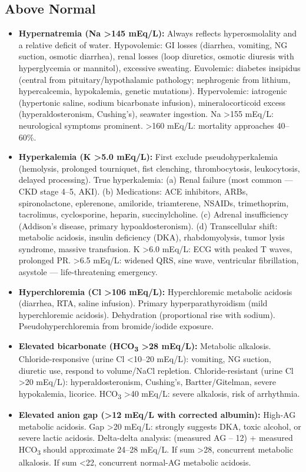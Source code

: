 \subsection*{Above Normal}
\begin{itemize}
  \item \textbf{Hypernatremia (Na >145 mEq/L):} Always reflects hyperosmolality and a relative deficit of water. Hypovolemic: GI losses (diarrhea, vomiting, NG suction, osmotic diarrhea), renal losses (loop diuretics, osmotic diuresis with hyperglycemia or mannitol), excessive sweating. Euvolemic: diabetes insipidus (central from pituitary/hypothalamic pathology; nephrogenic from lithium, hypercalcemia, hypokalemia, genetic mutations). Hypervolemic: iatrogenic (hypertonic saline, sodium bicarbonate infusion), mineralocorticoid excess (hyperaldosteronism, Cushing's), seawater ingestion. Na >155 mEq/L: neurological symptoms prominent. >160 mEq/L: mortality approaches 40--60\%.
  \item \textbf{Hyperkalemia (K >5.0 mEq/L):} First exclude pseudohyperkalemia (hemolysis, prolonged tourniquet, fist clenching, thrombocytosis, leukocytosis, delayed processing). True hyperkalemia: (a) Renal failure (most common --- CKD stage 4--5, AKI). (b) Medications: ACE inhibitors, ARBs, spironolactone, eplerenone, amiloride, triamterene, NSAIDs, trimethoprim, tacrolimus, cyclosporine, heparin, succinylcholine. (c) Adrenal insufficiency (Addison's disease, primary hypoaldosteronism). (d) Transcellular shift: metabolic acidosis, insulin deficiency (DKA), rhabdomyolysis, tumor lysis syndrome, massive transfusion. K >6.0 mEq/L: ECG with peaked T waves, prolonged PR. >6.5 mEq/L: widened QRS, sine wave, ventricular fibrillation, asystole --- life-threatening emergency.
  \item \textbf{Hyperchloremia (Cl >106 mEq/L):} Hyperchloremic metabolic acidosis (diarrhea, RTA, saline infusion). Primary hyperparathyroidism (mild hyperchloremic acidosis). Dehydration (proportional rise with sodium). Pseudohyperchloremia from bromide/iodide exposure.
  \item \textbf{Elevated bicarbonate (HCO\textsubscript{3} >28 mEq/L):} Metabolic alkalosis. Chloride-responsive (urine Cl <10--20 mEq/L): vomiting, NG suction, diuretic use, respond to volume/NaCl repletion. Chloride-resistant (urine Cl >20 mEq/L): hyperaldosteronism, Cushing's, Bartter/Gitelman, severe hypokalemia, licorice. HCO\textsubscript{3} >40 mEq/L: severe alkalosis, risk of arrhythmia.
  \item \textbf{Elevated anion gap (>12 mEq/L with corrected albumin):} High-AG metabolic acidosis. Gap >20 mEq/L: strongly suggests DKA, toxic alcohol, or severe lactic acidosis. Delta-delta analysis: (measured AG -- 12) + measured HCO\textsubscript{3} should approximate 24--28 mEq/L. If sum >28, concurrent metabolic alkalosis. If sum <22, concurrent normal-AG metabolic acidosis.
\end{itemize}

